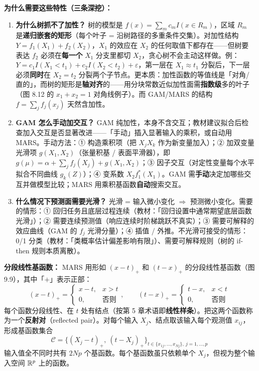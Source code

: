 \textbf{为什么需要这些特性（三条深挖）：}
\begin{enumerate}
    \item \textbf{为什么树抓不了加性？} 树的模型是 $f(x) = \sum_m c_m I(x \in R_m)$，区域 $R_m$ 是\textbf{递归嵌套的矩形}（每个叶子 = 沿树路径的多重条件交集）。对加性结构 $Y = f_1(X_1) + f_2(X_2)$，$X_1$ 的效应在 $X_2$ 的任何取值下都存在——但树要表达 $f_2$ 必须在\textbf{每一个} $X_1$ 分支里都切 $X_2$，贪心树不会主动这样做。例：$Y = c_1 I(X_1 < t_1) + c_2 I(X_2 < t_2) + \varepsilon$，第一层在 $X_1 \approx t_1$ 分裂后，下一层必须\textbf{同时}在 $X_2 = t_2$ 分裂两个子节点。更本质：加性函数的等值线是「对角/直的」，而树的矩形是\textbf{轴对齐}的——用分块常数近似加性面需\textbf{指数级}多的叶子（图 8.12 的 $x_1 + x_2 = 1$ 对角线例子）。而 GAM/MARS 的结构 $f = \sum_j f_j(x_j)$ 天然含加性。
    \item \textbf{GAM 怎么手动加交互？} GAM 纯加性，本身不含交互；教材建议拟合后检查加入交互是否显著改进——「手动」插入显著输入的乘积，或自动用 MARS。手动方法：① 构造乘积项（把 $X_j X_k$ 作为新变量加入）；② 加双变量光滑项 $g(X_1, X_2)$（张量积基 / 表面平滑器），即 $g(\mu) = \alpha + \sum_j f_j(X_j) + g(X_1, X_2)$；③ 因子交互（对定性变量每个水平拟合不同曲线 $g_k(Z)$）；④ 变系数 $X_2 f_1^*(X_1)$。GAM 需\textbf{手动}决定加哪些交互并做模型比较；MARS 用乘积基函数\textbf{自动}搜索交互。
    \item \textbf{什么情况下预测面需要光滑？} 光滑 = 输入微小变化 $\Rightarrow$ 预测微小变化。需要的情形：① 回归任务且底层过程连续（教材：「回归设置中通常期望底层函数光滑」）；② 需要连续预测值（响应连续时阶梯跳跃不真实）；③ 需要可解释的效应曲线（GAM 的 $f_j$ 光滑分量）；④ 插值 / 外推。不光滑可接受的情形：0/1 分类（教材：「类概率估计偏差影响有限」）、需要可解释规则（树的 if-then 规则本质离散）。
\end{enumerate}

\textbf{分段线性基函数：} MARS 用形如 $(x-t)_+$ 和 $(t-x)_+$ 的分段线性基函数（图 9.9），其中「$+$」表示正部：
\[
    (x-t)_+ = \begin{cases} x - t, & x > t \\ 0, & \text{否则} \end{cases},\qquad
    (t-x)_+ = \begin{cases} t - x, & x < t \\ 0, & \text{否则} \end{cases}
\]
每个函数分段线性、在 $t$ 处有结点（按第 5 章术语即\textbf{线性样条}）。把这两个函数称为一个\textbf{反射对}（reflected pair）。对每个输入 $X_j$、结点取该输入每个观测值 $x_{ij}$，形成基函数集合
\begin{equation}\label{eq:9_18}
    \mathcal{C} = \{(X_j - t)_+,\ (t - X_j)_+\}_{t \in \{x_{1j},\ldots,x_{Nj}\},\ j=1,\ldots,p}
\end{equation}
输入值全不同时共有 $2Np$ 个基函数。每个基函数虽只依赖单个 $X_j$，但视为整个输入空间 $\mathbb{R}^p$ 上的函数。

